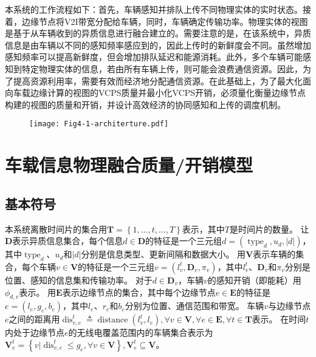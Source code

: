 本系统的工作流程如下：首先，车辆感知并排队上传不同物理实体的实时状态。接着，边缘节点将V2I带宽分配给车辆，同时，车辆确定传输功率。物理实体的视图是基于从车辆收到的异质信息进行融合建立的。需要注意的是，在该系统中，异质信息是由车辆以不同的感知频率感应到的，因此上传时的新鲜度会不同。虽然增加感知频率可以提高新鲜度，但会增加排队延迟和能源消耗。此外，多个车辆可能感知到特定物理实体的信息，若由所有车辆上传，则可能会浪费通信资源。因此，为了提高资源利用率，需要有效而经济地分配通信资源。在此基础上，为了最大化面向车载边缘计算的视图的VCPS质量并最小化VCPS开销，必须量化衡量边缘节点构建的视图的质量和开销，并设计高效经济的协同感知和上传的调度机制。

\begin{figure}[h]
\centering
  \texttt{[image: Fig4-1-architerture.pdf]}
  \label{fig 4-1}
\end{figure} 

\section{车载信息物理融合质量/开销模型}\label{section 4-3}
\subsection{基本符号}
本系统离散时间片的集合用$\mathbf{T}=\left\{1,\ldots,t,\ldots, T \right\}$表示，其中$T$是时间片的数量。
让$\mathbf{D}$表示异质信息集合，每个信息$d \in \mathbf{D}$的特征是一个三元组$d=\left(\operatorname{type}_d, u_d, \left|d\right| \right)$，其中$\operatorname{type}_d$、$u_d$和$\left|d\right|$分别是信息类型、更新间隔和数据大小。
用$\mathbf{V}$表示车辆的集合，每个车辆$v\in \mathbf{V}$的特征是一个三元组$v=\left (l_v^t, \mathbf{D}_v, \pi_v \right )$，其中$l_v^t$、$\mathbf{D}_v$和$\pi_v$分别是位置、感知的信息集和传输功率。
对于$d \in \mathbf{D}_v$，车辆$v$的感知开销（即能耗）用$\phi_{d, v}$表示。
用$\mathbf{E}$表示边缘节点的集合，其中每个边缘节点$e \in \mathbf{E}$的特征是$e=\left (l_e, g_e, b_e \right)$，其中$l_{e}$、$r_{e}$和$b_{e}$分别为位置、通信范围和带宽。
车辆$v$与边缘节点$e$之间的距离用$\operatorname{dis}_{v, e}^t \triangleq \operatorname{distance} \left (l_v^t, l_e \right ), \forall v \in \mathbf{V}, \forall e \in \mathbf{E}, \forall t \in \mathbf{T}$表示。
在时间$t$内处于边缘节点$e$的无线电覆盖范围内的车辆集合表示为$\mathbf{V}_e^t=\left \{v \vert \operatorname{dis}_{v, e}^t \leq g_e, \forall v \in \mathbf{V} \right \}, \mathbf{V}_e^t \subseteq \mathbf{V}$。

